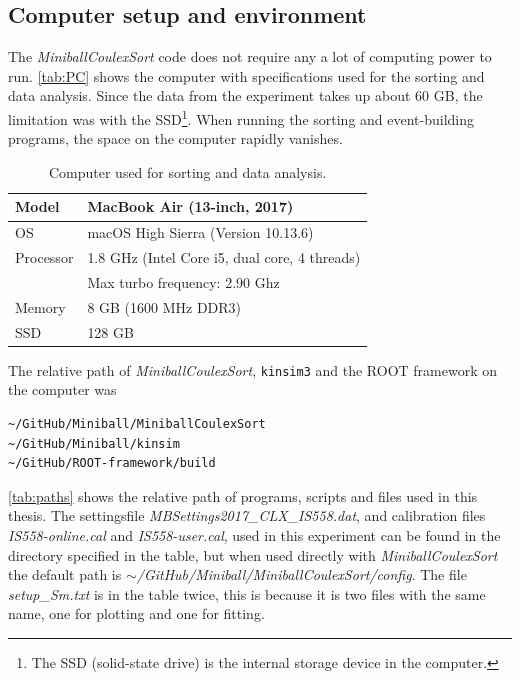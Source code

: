 \documentclass[twoside,english]{uiofysmaster/uiofysmaster}
\let\orgautoref\autoref
\renewcommand{\autoref}
        {%
		 \def\sectionautorefname{Section}%
		 \def\subsectionautorefname{Section}%
		 \def\subsubsectionautorefname{Section}%
		 \def\chapterautorefname{Chapter}%
          \orgautoref}
\begin{document}
\begin{appendices}

\chapter{Computer setup and environment}\label{a:computer_environment}

The \textsl{MiniballCoulexSort} code does not require any a lot of computing power to run. \autoref{tab:PC} shows the computer with specifications used for the sorting and data analysis. Since the data from the experiment takes up about 60 GB, the limitation was with the SSD\footnote{The SSD (solid-state drive) is the internal storage device in the computer.}. When running the sorting and event-building programs, the space on the computer rapidly vanishes. 

\begin{table}[ht] 
	\centering 
	\caption{Computer used for sorting and data analysis.}
	\label{tab:PC}
	\begin{tabular}{ll}
		\hline
		Model & MacBook Air (13-inch, 2017) \\
		\hline
		OS              & macOS High Sierra (Version 10.13.6) \\
		Processor  &  1.8 GHz (Intel Core i5, dual core, 4 threads)  \\
						 &  Max turbo frequency: 2.90 Ghz  \\
		Memory     &  8 GB (1600 MHz DDR3)  \\
		SSD		     &  128 GB  \\
		\hline
	\end{tabular}
\end{table}

The relative path of \textsl{MiniballCoulexSort}, \texttt{kinsim3} and the ROOT framework on the computer was
\begin{lstlisting}[language=sh]
~/GitHub/Miniball/MiniballCoulexSort
~/GitHub/Miniball/kinsim
~/GitHub/ROOT-framework/build
\end{lstlisting}

\autoref{tab:paths} shows the relative path of programs, scripts and files used in this thesis. 
The settingsfile \textit{MBSettings2017\_CLX\_IS558.dat}, and calibration files \textit{IS558-online.cal} and \textit{IS558-user.cal}, used in this experiment can be found in the directory specified in the table, but when used directly with \textsl{MiniballCoulexSort} the default path is \textit{$\sim$/GitHub/Miniball/MiniballCoulexSort/config}.
The file \textit{setup\_Sm.txt} is in the table twice, this is because it is two files with the same name, one for plotting and one for fitting.


\end{appendices}
\end{document}
